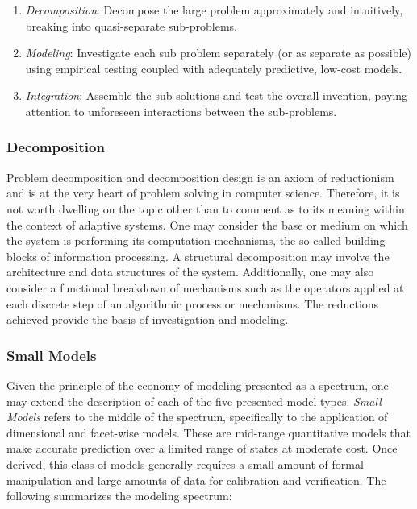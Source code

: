 \documentclass[a4paper, 11pt]{article}
\begin{document}
\begin{enumerate}
	\item \emph{Decomposition}: Decompose the large problem approximately and intuitively, breaking into quasi-separate sub-problems.
	\item \emph{Modeling}: Investigate each sub problem separately (or as separate as possible) using empirical testing coupled with adequately predictive, low-cost models.
	\item \emph{Integration}: Assemble the sub-solutions and test the overall invention, paying attention to unforeseen interactions between the sub-problems.
\end{enumerate}

\subsubsection{Decomposition} 
Problem decomposition and decomposition design is an axiom of reductionism and is at the very heart of problem solving in computer science. Therefore, it is not worth dwelling on the topic other than to comment as to its meaning within the context of adaptive systems. One may consider the base or medium on which the system is performing its computation mechanisms, the so-called building blocks of information processing. A structural decomposition may involve the architecture and data structures of the system. Additionally, one may also consider a functional breakdown of mechanisms such as the operators applied at each discrete step of an algorithmic process or mechanisms. The reductions achieved provide the basis of investigation and modeling.

\subsubsection{Small Models} 
Given the principle of the economy of modeling presented as a spectrum, one may extend the description of each of the five presented model types. \emph{Small Models} refers to the middle of the spectrum, specifically to the application of dimensional and facet-wise models. These are mid-range quantitative models that make accurate prediction over a limited range of states at moderate cost. Once derived, this class of models generally requires a small amount of formal manipulation and large amounts of data for calibration and verification. The following summarizes the modeling spectrum:
\end{document}
